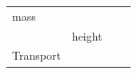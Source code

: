 {\begin{tabular}[t]{|l|l|l|l|}
    
        mass &
    
    
         &
    
    
     \tabularnewline\cline{1-1}\cline{2-2}\cline{3-3}\cline{4-4}
    
    
         &
    
    
        height &
    
    
         &
    
    
     \tabularnewline\cline{1-1}\cline{2-2}\cline{3-3}\cline{4-4}
    
    
        Transport &
    

\end{tabular}}
